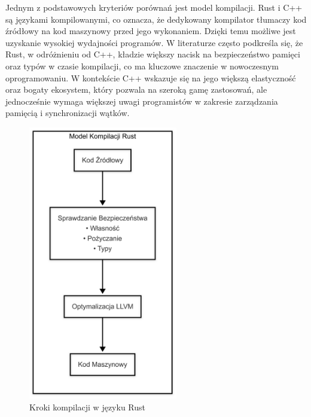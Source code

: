 Jednym z podstawowych kryteriów porównań jest model kompilacji. Rust i C++ są językami kompilowanymi, co oznacza, że dedykowany kompilator tłumaczy kod źródłowy na kod maszynowy przed jego wykonaniem. Dzięki temu możliwe jest uzyskanie wysokiej wydajności programów. W literaturze \cite{Lesiński} często podkreśla się, że Rust, w odróżnieniu od C++, kładzie większy nacisk na bezpieczeństwo pamięci oraz typów w czasie kompilacji, co ma kluczowe znaczenie w nowoczesnym oprogramowaniu. W kontekście C++ wskazuje się na jego większą elastyczność oraz bogaty ekosystem, który pozwala na szeroką gamę zastosowań, ale jednocześnie wymaga większej uwagi programistów w zakresie zarządzania pamięcią i synchronizacji wątków.
\begin{figure}[H]
    \centering
    \begin{minipage}{.5\textwidth}
        \centering
        \includegraphics[height=12cm]{images/RustBuildsSteps.png}
        \caption{Kroki kompilacji w języku Rust}
        \label{fig:rust_build_steps}
    \end{minipage}%
    \begin{minipage}{.5\textwidth}
        \centering

\end{minipage}
\end{figure}
